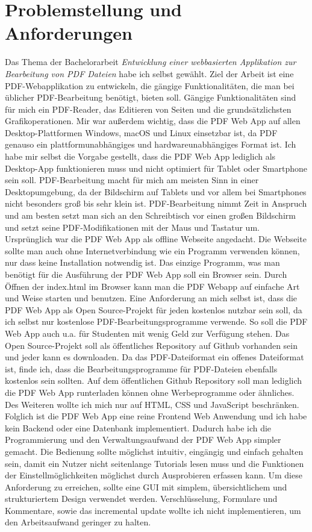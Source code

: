 \section{Problemstellung und Anforderungen}
Das Thema der Bachelorarbeit \textit{\glqq Entwicklung einer webbasierten Applikation zur Bearbeitung von PDF Dateien\grqq} habe ich selbst gewählt. Ziel der Arbeit ist eine PDF-Webapplikation zu entwickeln, die gängige Funktionalitäten, die man bei üblicher PDF-Bearbeitung benötigt, bieten soll. Gängige Funktionalitäten sind für mich ein PDF-Reader, das Editieren von Seiten und die grundsätzlichsten Grafikoperationen. Mir war außerdem wichtig, dass die PDF Web App auf allen Desktop-Plattformen Windows, macOS und Linux einsetzbar ist, da PDF genauso ein plattformunabhängiges und hardwareunabhängiges Format ist. Ich habe mir selbst die Vorgabe gestellt, dass die PDF Web App lediglich als Desktop-App funktionieren muss und nicht optimiert für Tablet oder Smartphone sein soll. PDF-Bearbeitung macht für mich am meisten Sinn in einer Desktopumgebung, da der Bildschirm auf Tablets und vor allem bei Smartphones nicht besonders groß bis sehr klein ist. PDF-Bearbeitung nimmt Zeit in Anspruch und am besten setzt man sich an den Schreibtisch vor einen großen Bildschirm und setzt seine PDF-Modifikationen mit der Maus und Tastatur um. \\
Ursprünglich war die PDF Web App als offline Webseite angedacht. Die Webseite sollte man auch ohne Internetverbindung wie ein Programm verwenden können, nur dass keine Installation notwendig ist. Das einzige Programm, was man benötigt für die Ausführung der PDF Web App soll ein Browser sein. Durch Öffnen der index.html im Browser kann man die PDF Webapp auf einfache Art und Weise starten und benutzen. Eine Anforderung an mich selbst ist, dass die PDF Web App als Open Source-Projekt für jeden kostenlos nutzbar sein soll, da ich selbst nur kostenlose PDF-Bearbeitungsprogramme verwende. So soll die PDF Web App auch u.a. für Studenten mit wenig Geld zur Verfügung stehen. Das Open Source-Projekt soll als öffentliches Repository auf Github vorhanden sein und jeder kann es downloaden. Da das PDF-Dateiformat ein offenes Dateiformat ist, finde ich, dass die Bearbeitungsprogramme für PDF-Dateien ebenfalls kostenlos sein sollten. Auf dem öffentlichen Github Repository soll man lediglich die PDF Web App runterladen können ohne Werbeprogramme oder ähnliches. \\
Des Weiteren wollte ich mich nur auf HTML, CSS und JavaScript beschränken. Folglich ist die PDF Web App eine reine Frontend Web Anwendung und ich habe kein Backend oder eine Datenbank implementiert. Dadurch habe ich die Programmierung und den Verwaltungsaufwand der PDF Web App simpler gemacht. Die Bedienung sollte möglichst intuitiv, eingängig und einfach gehalten sein, damit ein Nutzer nicht seitenlange Tutorials lesen muss und die Funktionen der Einstellmöglichkeiten möglichst durch Ausprobieren erfassen kann. Um diese Anforderung zu erreichen, sollte eine GUI mit simplem, übersichtlichem und strukturiertem Design verwendet werden. Verschlüsselung, Formulare und Kommentare, sowie das incremental update wollte ich nicht implementieren, um den Arbeitsaufwand geringer zu halten. \\
